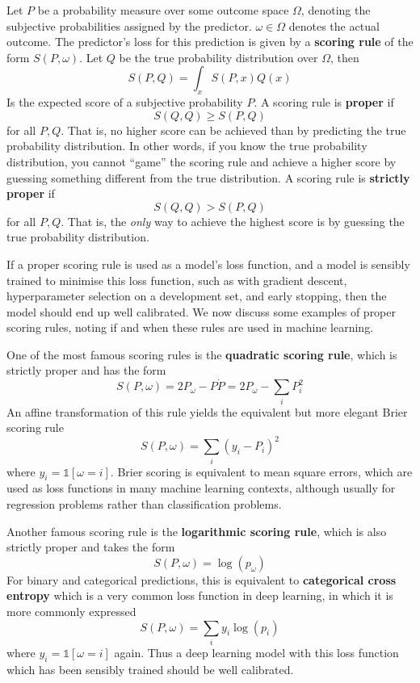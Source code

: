 Let $P$ be a probability measure over some outcome space $\Omega$, denoting the subjective probabilities assigned by the predictor. $\omega \in \Omega$ denotes the actual outcome. The predictor’s loss for this prediction is given by a {\bf scoring rule} of the form $S(P,\omega)$. Let $Q$ be the true probability distribution over $\Omega$, then
\begin{equation}
	S(P,Q) = \int_x S(P,x)Q(x) 
\end{equation}
Is the expected score of a subjective probability $P$. A scoring rule is {\bf proper} if 
\begin{equation}
	S(Q,Q) \ge S(P,Q)
\end{equation}
for all $P,Q$. That is, no higher score can be achieved than by predicting the true probability distribution. In other words, if you know the true probability distribution, you cannot ``game” the scoring rule and achieve a higher score by guessing something different from the true distribution. A scoring rule is {\bf strictly proper} if
\begin{equation}
	S(Q,Q) > S(P,Q)
\end{equation}
for all $P,Q$. That is, the {\it only} way to achieve the highest score is by guessing the true probability distribution.

If a proper scoring rule is used as a model’s loss function, and a model is sensibly trained to minimise this loss function, such as with gradient descent, hyperparameter selection on a development set, and early stopping, then the model should end up well calibrated. We now discuss some examples of proper scoring rules, noting if and when these rules are used in machine learning.

One of the most famous scoring rules is the {\bf quadratic scoring rule}, which is strictly proper and has the form
\begin{equation}
	S(P,\omega) = 2 P_\omega - P \dot P = 2 P_\omega - \sum_i P_i^2
\end{equation}
An affine transformation of this rule yields the equivalent but more elegant Brier scoring rule \cite{scoring_rules}
\begin{equation}
	S(P,\omega) = \sum_i (y_i - P_i)^2
\end{equation}
where $y_i = \mathds{1}[\omega=i]$. Brier scoring is equivalent to mean square errors, which are used as loss functions in many machine learning contexts, although usually for regression problems rather than classification problems.

Another famous scoring rule is the {\bf logarithmic scoring rule}, which is also strictly proper and takes the form
\begin{equation}
	S(P,\omega) = \log (p_\omega)
\end{equation}
For binary and categorical predictions, this is equivalent to {\bf categorical cross entropy} which is a very common loss function in deep learning, in which it is more commonly expressed
\begin{equation}
	S(P,\omega) = \sum_i y_i \log(p_i)
\end{equation}
where $y_i = \mathds{1}[\omega=i]$ again. Thus a deep learning model with this loss function which has been sensibly trained should be well calibrated.

